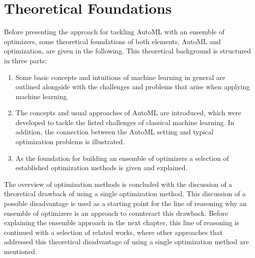 %
\chapter{Theoretical Foundations}
\label{sec:theory}
Before presenting the approach for tackling AutoML with an ensemble of optimizers, some theoretical foundations of both elements, AutoML and optimization, are given in the following.
This theoretical background is structured in three parts:
\begin{enumerate}
    \item Some basic concepts and intuitions of machine learning in general are outlined alongside with the challenges and problems that arise when applying machine learning.
    \item The concepts and usual approaches of AutoML are introduced, which were developed to tackle the listed challenges of classical machine learning. In addition, the connection between the AutoML setting and typical optimization problems is illustrated.
    \item As the foundation for building an ensemble of optimizers a selection of established optimization methods is given and explained.
\end{enumerate}
The overview of optimization methods is concluded with the discussion of a theoretical drawback of using a single optimization method.
This discussion of a possible disadvantage is used as a starting point for the line of reasoning why an ensemble of optimizers is an approach to counteract this drawback.
Before explaining the ensemble approach in the next chapter, this line of reasoning is continued with a selection of related works, where other approaches that addressed this theoretical disadvantage of using a single optimization method are mentioned. 

